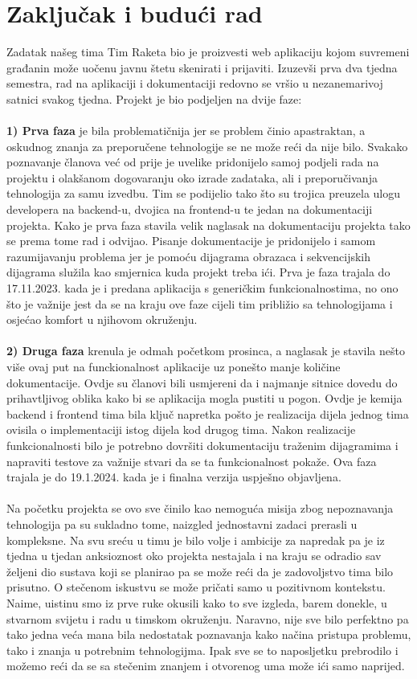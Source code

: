 \chapter{Zaključak i budući rad}
		
		Zadatak našeg tima Tim Raketa bio je proizvesti web aplikaciju kojom suvremeni građanin može uočenu javnu štetu skenirati i prijaviti. Izuzevši prva dva tjedna semestra, rad na aplikaciji i dokumentaciji redovno se vršio u nezanemarivoj satnici svakog tjedna. Projekt je bio podjeljen na dvije faze: \\
		\\
		\indent \textbf{1) Prva faza} je bila problematičnija jer se problem činio apastraktan, a oskudnog znanja za preporučene tehnologije se ne može reći da nije bilo. Svakako poznavanje članova već od prije je uvelike pridonijelo samoj podjeli rada na projektu i olakšanom dogovaranju oko izrade zadataka, ali i preporučivanja tehnologija za samu izvedbu. Tim se podijelio tako što su trojica preuzela ulogu developera na backend-u, dvojica na frontend-u te jedan na dokumentaciji projekta. Kako je prva faza stavila velik naglasak na dokumentaciju projekta tako se prema tome rad i odvijao. Pisanje dokumentacije je pridonijelo i samom razumijavanju problema jer je pomoću dijagrama obrazaca i sekvencijskih dijagrama služila kao smjernica kuda projekt treba ići. Prva je faza trajala do 17.11.2023. kada je i predana aplikacija s generičkim funkcionalnostima, no ono što je važnije jest da se na kraju ove faze cijeli tim približio sa tehnologijama i osjećao komfort u njihovom okruženju.\\
		\\
		\indent \textbf{2) Druga faza} krenula je odmah početkom prosinca, a naglasak je stavila nešto više ovaj put na funckionalnost aplikacije uz ponešto manje količine dokumentacije. Ovdje su članovi bili usmjereni da i najmanje sitnice dovedu do prihavtljivog oblika kako bi se aplikacija mogla pustiti u pogon.  Ovdje je kemija backend i frontend tima bila ključ napretka pošto je realizacija dijela jednog tima ovisila o implementaciji istog dijela kod drugog tima. Nakon realizacije funkcionalnosti bilo je potrebno dovršiti dokumentaciju traženim dijagramima i napraviti testove za važnije stvari da se ta funkcionalnost pokaže. Ova faza trajala je do 19.1.2024. kada je i finalna verzija uspješno objavljena.\\
		\\
		Na početku projekta se ovo sve činilo kao nemoguća misija zbog nepoznavanja tehnologija pa su sukladno tome, naizgled jednostavni zadaci prerasli u kompleksne. Na svu sreću u timu je bilo volje i ambicije za napredak pa je iz tjedna u tjedan anksioznost oko projekta nestajala i na kraju se odradio sav željeni dio sustava koji se planirao pa se može reći da je zadovoljstvo tima bilo prisutno. O stečenom iskustvu se može pričati samo u pozitivnom kontekstu. Naime, uistinu smo iz prve ruke okusili kako to sve izgleda, barem donekle, u stvarnom svijetu i radu u timskom okruženju. Naravno, nije sve bilo perfektno pa tako jedna veća mana bila nedostatak poznavanja kako načina pristupa problemu, tako i znanja u potrebnim tehnologijma. Ipak sve se to naposljetku prebrodilo i možemo reći da se sa stečenim znanjem i otvorenog uma može ići samo naprijed.
		\eject 